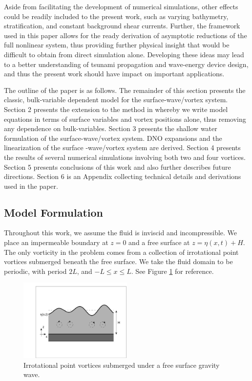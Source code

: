 \documentclass[a4paper,11pt]{article}
\begin{document}
Aside from facilitating the development of numerical simulations, other effects could be readily included to the present work, such as varying bathymetry, stratification, and constant background shear currents.  Further, the framework used in this paper allows for the ready derivation of asymptotic reductions of the full nonlinear system, thus providing further physical insight that would be difficult to obtain from direct simulation alone. Developing these ideas may lead to a better understanding of tsunami propagation and wave-energy device design, and thus the present work should have impact on important applications.    

The outline of the paper is as follows.  The remainder of this section presents the classic, bulk-variable dependent model for the surface-wave/vortex system.  Section 2 presents the extension to the method in \cite{afm} whereby we write model equations in terms of surface variables and vortex positions alone, thus removing any dependence on bulk-variables.  Section 3 presents the shallow water formulation of the surface-wave/vortex system.  DNO expansions and the linearization of the surface -wave/vortex system are derived.  Section 4 presents the results of several numerical simulations involving both two and four vortices.  Section 5 presents conclusions of this work and also further describes future directions.  Section 6 is an Appendix collecting technical details and derivations used in the paper.  
  
\subsection{Model Formulation}
Throughout this work, we assume the fluid is inviscid and incompressible.  We place an impermeable boundary at $z=0$ and a free surface at $z=\eta(x,t)+H$.  The only vorticity in the problem comes from a collection of irrotational point vortices submerged beneath the free surface.  We take the fluid domain to be periodic, with period $2L$, and $-L\leq x \leq L$.  See Figure \ref{fig:vortex} for reference.  
\begin{figure}
\centering
\includegraphics[width=0.5\textwidth]{CurtisKalisch_Vortices}
\caption{\small Irrotational point vortices submerged under a free surface gravity wave.}
\label{fig:vortex}
\end{figure}
\end{document}
